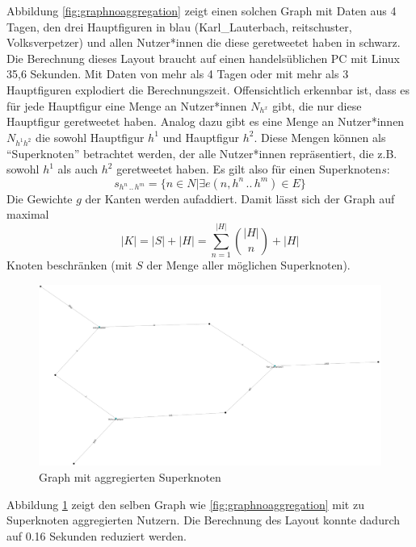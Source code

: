 Abbildung \ref{fig:graphnoaggregation} zeigt einen solchen Graph mit Daten aus 4 Tagen, den drei Hauptfiguren in blau (Karl\_Lauterbach, reitschuster, Volksverpetzer) und allen Nutzer*innen die diese \gls{geretweetet} haben in schwarz. Die Berechnung dieses Layout braucht auf einen handelsüblichen PC mit Linux 35,6 Sekunden. 
Mit Daten von mehr als 4 Tagen oder mit mehr als 3 Hauptfiguren explodiert die Berechnungszeit. 
Offensichtlich erkennbar ist, dass es  für jede Hauptfigur eine Menge an Nutzer*innen $N_{h^x}$ gibt, die nur diese Hauptfigur \gls{geretweetet} haben.
Analog dazu gibt es eine Menge an Nutzer*innen $N_{h^1h^2}$ die sowohl Hauptfigur $h^1$ und Hauptfigur $h^2$. 
Diese Mengen können als "`Superknoten"' betrachtet werden, der alle Nutzer*innen repräsentiert, die z.B. sowohl $h^1$ als auch $h^2$ \gls{geretweetet} haben.
Es gilt also für einen Superknoten$s$:
 \begin{equation}
s_{h^n\,..\,h^m} = \{n\in N|\exists e(n,h^n\,..\,h^m)\in E\}
\end{equation}
Die Gewichte $g$ der Kanten werden aufaddiert. 
Damit lässt sich der Graph auf maximal
\begin{equation}
|K| = |S| + |H| = \sum_{n=1}^{|H|} \binom{|H|}{n} + |H|
\end{equation}
Knoten beschränken (mit $S$ der Menge aller möglichen Superknoten).
\begin{figure}[h]
	\centering
	\includegraphics[width=0.7\linewidth]{images/GraphNoThreshold}
	\caption{Graph mit aggregierten Superknoten}
	\label{fig:graphnothreshold}
\end{figure}
Abbildung \ref{fig:graphnothreshold} zeigt den selben Graph wie \ref{fig:graphnoaggregation} mit zu Superknoten aggregierten Nutzern.
Die Berechnung des Layout konnte dadurch auf 0.16 Sekunden reduziert werden.

